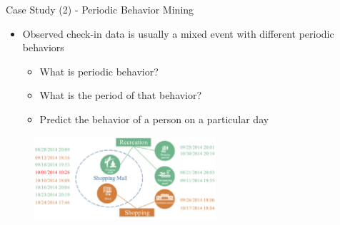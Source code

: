 \documentclass[
 size=14pt,
 paper=smartboard,  %
 mode=present, 		%
 display=slides, 	%
 style=tuliplab,  	%
 pauseslide,
 fleqn,leqno]{powerdot}{}
\begin{document}
\begin{slide}[toc=,bm=]{Case Study (2) - Periodic Behavior Mining}

\begin{itemize}
\item
Observed check-in data is usually a mixed event with different periodic behaviors

\begin{itemize}
\item
What is periodic behavior?

\item
What is the period of that behavior?

\item
Predict the behavior of a person on a particular day
\end{itemize}
\end{itemize}

\begin{figure}[htbp]
    \centering
    \includegraphics[width=0.6\textwidth]{figures//theme1//Theme1_18.eps}
\end{figure}


\end{slide}
\end{document}
